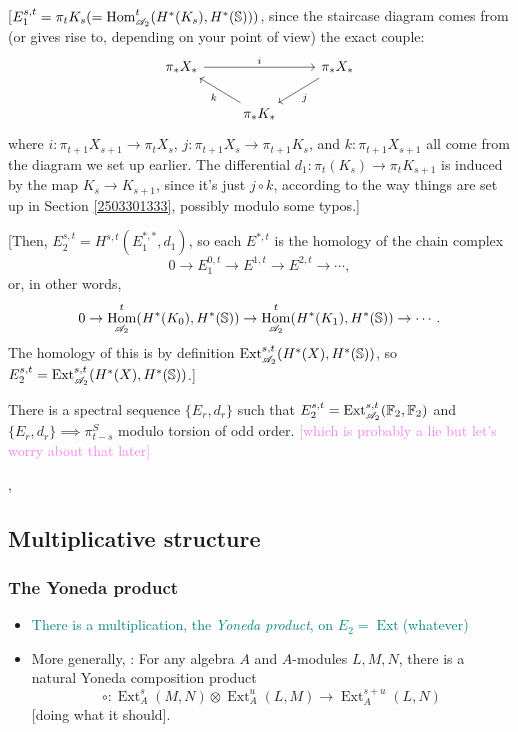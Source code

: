 \documentclass{MetricNotes2023}
\def\bb{\ensuremath\mathbb}
\def\A{\ensuremath{\mathscr{A}_2}}
\DeclareMathOperator{\Ext}{Ext}
\DeclareMathOperator{\Hom}{Hom}
\def\textcolour{\textcolor}
\begin{document}
[\(E_1^{s,t} = \pi_t K_s (=\Hom^t_{\A}(H^*(K_s), H^*(\bb{S})))\), since the staircase diagram comes from (or gives rise to, depending on your point of view) the exact couple:
\[\begin{tikzcd}
 \pi_*X_* \arrow[rr, "i"] & & \pi_* X_* \arrow[dl, "j"] \\ 
 & \pi_*K_* \arrow[ul, "k"] & 
 \end{tikzcd}\]
where \(i : \pi_{t+1}X_{s+1}\to \pi_tX_s\), \(j : \pi_{t+1}X_s \to \pi_{t+1}K_s\), and \(k : \pi_{t+1}X_{s+1}\) all come from the diagram we set up earlier. The differential \(d_1 : \pi_t(K_s)\to\pi_t K_{s+1}\) is induced by the map \(K_s \to K_{s+1}\), since it's just \(j\circ k\), according to the way things are set up in Section \ref{2503301333}, possibly modulo some typos.]

[Then, \(E^{s,t}_2=H^{s,t}(E_1^{*,*}, d_1)\), so each \(E^{*, t}\) is the homology of the chain complex
\[0 \to E^{0,t}_1 \to E^{1,t}\to E^{2,t}\to \cdots,\]
or, in other words,
\[0 \to \Hom^t_{\A}(H^*(K_0), H^*(\bb{S}))\to \Hom^t_{\A}(H^*(K_1), H^*(\bb{S}))\to \cdots.\]
The homology of this is by definition \(\Ext_{\A}^{s,t}(H^*(X), H^*(\bb{S}))\), so \(E_2^{s,t}=\Ext^{s,t}_{\A}(H^*(X), H^*(\bb{S}))\).]

\begin{theorem}\label{2504081125}
There is a spectral sequence \(\{E_r, d_r\}\) such that \(E_2^{s,t}=\Ext_{\A}^{s,t}(\bb{F}_2, \bb{F}_2)\) and \(\{E_r, d_r\}\implies \pi_{t-s}^S\) modulo torsion of odd order. \textcolour{violet}{[which is probably a lie but let's worry about that later]}
\end{theorem}



\autocite{spectral_sequences}, \autocite{hatcher5}

\subsection{Multiplicative structure}

\subsubsection{The Yoneda product}

\begin{itemize}
\item \textcolour{teal}{There is a multiplication, the \textit{Yoneda product}, on \(E_2 = \Ext\)(whatever)}
\item More generally, \autocite{rognes2}: For any algebra \(A\) and \(A\)-modules \(L,M,N\), there is a natural Yoneda composition product
\[\circ : \Ext_A^s(M,N)\otimes \Ext^u_A(L,M)\to \Ext_A^{s+u}(L,N)\]
[doing what it should].
\end{itemize}
\end{document}
